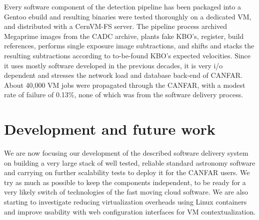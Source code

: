 Every software component of the detection pipeline has been packaged into a Gentoo ebuild and resulting binaries were tested thoroughly on a dedicated VM, and distributed with a CernVM-FS server. The pipeline process archived Megaprime images from the CADC archive, plants fake KBO's, register, build references, performs single exposure image subtractions, and shifts and stacks the resulting subtractions according to to-be-found KBO's expected velocities. Since it uses mostly software developed in the previous decades, it is very i/o dependent and stresses the network load and database back-end of CANFAR. About 40,000 VM jobs were propagated through the CANFAR, with a modest rate of failure of 0.13\%, none of which was from the software delivery process.

\section{Development and future work}
We are now focusing our development of the described software delivery system on building a very large stack of well tested, reliable standard astronomy software and carrying on further scalability tests to deploy it for the CANFAR users. We try as much as possible to keep the components independent, to be ready for a very likely switch of technologies of the fast moving cloud software. We are also starting to investigate reducing virtualization overheads using Linux containers and improve usability with web configuration interfaces for VM contextualization.


